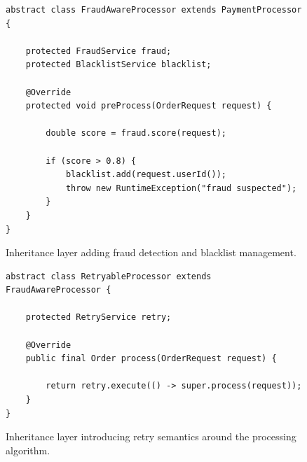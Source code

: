 \begin{figure}[t]
\centering
\begin{verbatim}
abstract class FraudAwareProcessor extends PaymentProcessor {

    protected FraudService fraud;
    protected BlacklistService blacklist;

    @Override
    protected void preProcess(OrderRequest request) {

        double score = fraud.score(request);

        if (score > 0.8) {
            blacklist.add(request.userId());
            throw new RuntimeException("fraud suspected");
        }
    }
}
\end{verbatim}
\caption{Inheritance layer adding fraud detection and blacklist management.}
\label{fig:fraud_processor}
\end{figure}


\begin{figure}[t]
\centering
\begin{verbatim}
abstract class RetryableProcessor extends FraudAwareProcessor {

    protected RetryService retry;

    @Override
    public final Order process(OrderRequest request) {

        return retry.execute(() -> super.process(request));
    }
}
\end{verbatim}
\caption{Inheritance layer introducing retry semantics around the processing algorithm.}
\label{fig:retry_processor}
\end{figure}


